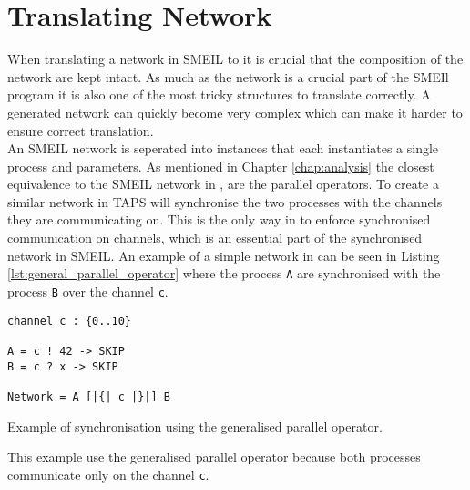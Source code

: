 \section{Translating Network}
\label{sec:design_translating_network}
When translating a network in SMEIL to \cspm{} it is crucial that the composition of the network are kept intact. As much as the network is a crucial part of the SMEIl program it is also one of the most tricky structures to translate correctly. A generated network can quickly become very complex which can make it harder to ensure correct translation. \\

An SMEIL network is seperated into instances that each instantiates a single process and parameters. As mentioned in Chapter \ref{chap:analysis} the closest equivalence to the SMEIL network in \cspm{}, are the parallel operators. To create a similar network in \cspm{} TAPS will synchronise the two processes with the channels they are communicating on.
This is the only way in \cspm{} to enforce synchronised communication on channels, which is an essential part of the synchronised network in SMEIL. An example of a simple network in \cspm{} can be seen in Listing \ref{lst:general_parallel_operator} where the process \texttt{A} are synchronised with the process \texttt{B} over the channel \texttt{c}.
\begin{listing}
\begin{verbatim}
channel c : {0..10}

A = c ! 42 -> SKIP
B = c ? x -> SKIP

Network = A [|{| c |}|] B
\end{verbatim}
\caption{Example of synchronisation using the generalised parallel operator.}
\label{lst:general_parallel_operator}
\end{listing}
This example use the generalised parallel operator because both processes communicate only on the channel \texttt{c}.

